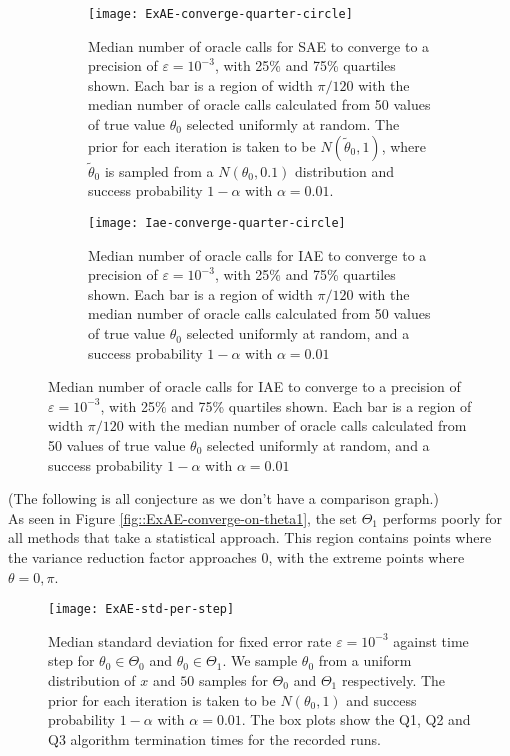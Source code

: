 \begin{figure}[htbp]
	\centering

	\begin{subfigure}{0.45\textwidth}
		\centering
		\texttt{[image: ExAE-converge-quarter-circle]}
		\caption{Median number of oracle calls for SAE to converge to a precision of $\varepsilon = 10^{-3}$, with 25\% and 75\% quartiles shown. Each bar is a region of width $\pi / 120$ with the median number of oracle calls calculated from 50 values of true value $\theta_0$ selected uniformly at random. The prior for each iteration is taken to be $N(\tilde{\theta}_0, 1)$, where $\tilde{\theta}_0$ is sampled from a $N(\theta_0, 0.1)$ distribution and success probability $1 - \alpha$ with $\alpha = 0.01$.}
		\label{fig::ExAE-converge-quarter-circle}
	\end{subfigure}
	\hfill
	\begin{subfigure}{0.45\textwidth}
		\centering
		\texttt{[image: Iae-converge-quarter-circle]}
		\caption{Median number of oracle calls for IAE to converge to a precision of $\varepsilon = 10^{-3}$, with 25\% and 75\% quartiles shown. Each bar is a region of width $\pi / 120$ with the median number of oracle calls calculated from 50 values of true value $\theta_0$ selected uniformly at random, and a success probability $1 - \alpha$ with $\alpha = 0.01$}
		\label{fig::Iae-converge-quarter-circle}
	\end{subfigure}
\end{figure}
\begin{center}
	\color{red}
	(The following is all conjecture as we don't have a comparison graph.) \\
As seen in Figure \ref{fig::ExAE-converge-on-theta1}, the set $\Theta_1$ performs poorly for all methods that take a statistical approach. This region contains points where the variance reduction factor approaches 0, with the extreme points where $\theta= 0, \pi$.
\end{center}

\begin{figure}[htbp]
	\centering
	\texttt{[image: ExAE-std-per-step]}
	\caption{Median standard deviation for fixed error rate $\varepsilon = 10^{-3}$ against time step for $\theta_0 \in \Theta_0$ and $\theta_0 \in \Theta_1$. We sample $\theta_0$ from a uniform distribution of $x$ and $50$ samples for $\Theta_0$ and $ \Theta_1$ respectively. The prior for each iteration is taken to be $N(\theta_0, 1)$ and success probability $1 - \alpha$ with $\alpha = 0.01$. The box plots show the Q1, Q2 and Q3 algorithm termination times for the recorded runs.}
	\label{fig::ExAE-std-per-step}
\end{figure}

